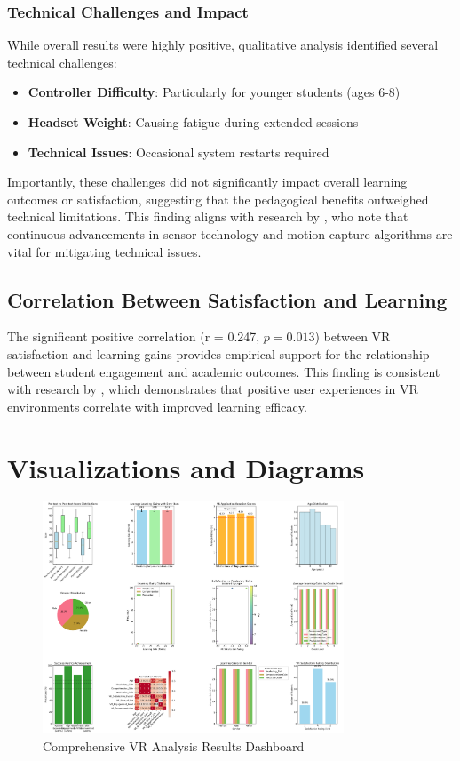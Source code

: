 \documentclass[12pt,a4paper]{article}
\begin{document}
\subsubsection{Technical Challenges and Impact}

While overall results were highly positive, qualitative analysis identified several technical challenges:

\begin{itemize}
    \item \textbf{Controller Difficulty}: Particularly for younger students (ages 6-8)
    \item \textbf{Headset Weight}: Causing fatigue during extended sessions
    \item \textbf{Technical Issues}: Occasional system restarts required
\end{itemize}

Importantly, these challenges did not significantly impact overall learning outcomes or satisfaction, suggesting that the pedagogical benefits outweighed technical limitations. This finding aligns with research by \citet{essoe2022enhancing}, who note that continuous advancements in sensor technology and motion capture algorithms are vital for mitigating technical issues.

\subsection{Correlation Between Satisfaction and Learning}

The significant positive correlation (r = 0.247, $p = 0.013$) between VR satisfaction and learning gains provides empirical support for the relationship between student engagement and academic outcomes. This finding is consistent with research by \citet{yuan2024practice}, which demonstrates that positive user experiences in VR environments correlate with improved learning efficacy.

\section{Visualizations and Diagrams}

\begin{figure}[H]
\centering
\includegraphics[width=0.8\textwidth]{detailed_vr_analysis_results.png}
\caption{Comprehensive VR Analysis Results Dashboard}
\label{fig:dashboard}
\end{figure}
\end{document}
